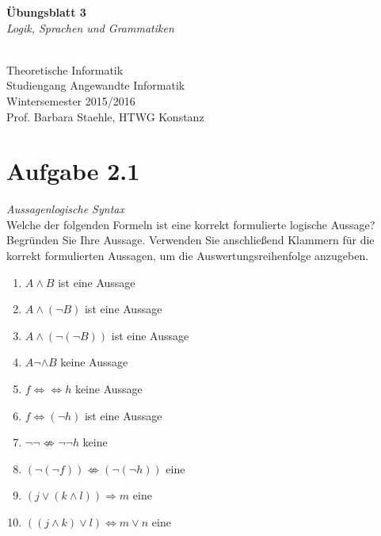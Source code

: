 \documentclass[12pt]{article}
\begin{document}
  \begin{center}
\begin{huge}
\textbf{Übungsblatt 3}\\
\textit{Logik, Sprachen und Grammatiken
}\end{huge} \\

Theoretische Informatik\\
Studiengang Angewandte Informatik\\
Wintersemester 2015/2016\\
Prof. Barbara Staehle, HTWG Konstanz
\end{center}
  \section*{Aufgabe 2.1}
  \textit{{Aussagenlogische Syntax}}
 \\
 Welche der folgenden Formeln ist eine korrekt formulierte logische Aussage? Begründen Sie Ihre Aussage. Verwenden Sie anschließend Klammern für die korrekt formulierten Aussagen, um die Auswertungsreihenfolge anzugeben.  
  
 \begin{enumerate} 
 \item $A \wedge B$ ist eine Aussage
 \item $A \wedge (\neg B)$ ist eine Aussage
 \item $A \wedge (\neg (\neg B))$ ist eine Aussage 
 \item $A \neg \wedge B$ keine Aussage 
 \item $f \Leftrightarrow \Leftrightarrow h$ keine Aussage 
 \item $f \Leftrightarrow (\neg h)$ ist eine Aussage
 \item $\neg \neg \not \Leftrightarrow \neg \neg h$ keine
 \item $(\neg (\neg f)) \not \Leftrightarrow (\neg (\neg h))$ eine 
 \item $(j \vee (k \wedge l)) \Rightarrow m$ eine 
 \item $((j \wedge k) \vee l) \Leftrightarrow m \vee n$ eine  
 \end{enumerate} 
  
  
  
  
  
\end{document}
